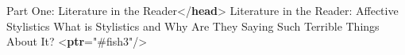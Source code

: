 \begin{shaded}
\hspace*{1em}\mbox{}\newline 
\hspace*{1em}\mbox{}\newline 
\hspace*{1em}\hspace*{1em}\mbox{}\newline 
\hspace*{1em}\hspace*{1em}\hspace*{1em}Part One: Literature in the Reader{</\textbf{head}>}\mbox{}\newline 
\hspace*{1em}\hspace*{1em}\hspace*{1em}Literature in the Reader: Affective Stylistics\mbox{}\newline 
\hspace*{1em}\hspace*{1em}\hspace*{1em}\mbox{}\newline 
\hspace*{1em}\hspace*{1em}\hspace*{1em}\mbox{}\newline 
\hspace*{1em}\hspace*{1em}\hspace*{1em}What is Stylistics and Why Are They Saying Such\mbox{}\newline 
\hspace*{1em}\hspace*{1em}\hspace*{1em}\hspace*{1em}\hspace*{1em}\hspace*{1em}\hspace*{1em}\hspace*{1em} Terrible Things About It? {<\textbf{ptr}\hspace*{1em}{target}="{\#fish3}"/>}\mbox{}\newline 

\end{shaded}
